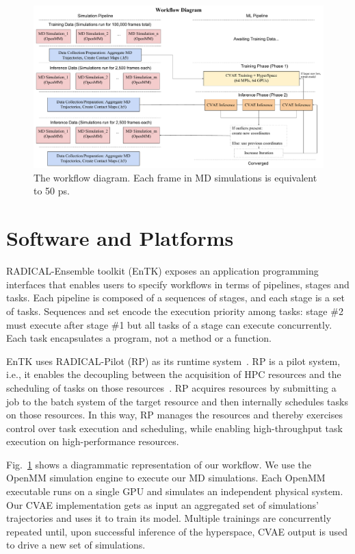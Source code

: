 \documentclass[conference,final]{IEEEtran}
\begin{document}
\begin{figure}
	\centering
	\includegraphics[width=.8\textwidth]{MicroScope_Workflow_Diagram}
	\caption{The workflow diagram. Each frame in MD simulations is equivalent to 50 ps. }
	\label{fig:microscopeworkflowdiagram}
\end{figure}

\section{Software and Platforms}

RADICAL-Ensemble toolkit (EnTK) exposes an application programming interfaces
that enables users to specify workflows in terms of pipelines, stages and
tasks. Each pipeline is composed of a sequences of stages, and each stage is
a set of tasks. Sequences and set encode the execution priority among tasks:
stage \#2 must execute after stage \#1 but all tasks of a stage can execute
concurrently. Each task encapsulates a program, not a method or a function.

EnTK uses RADICAL-Pilot (RP) as its runtime system~\cite{merzky2018using}. RP
is a pilot system, i.e., it enables the decoupling between the acquisition of
HPC resources and the scheduling of tasks on those
resources~\cite{turilli2018comprehensive}. RP acquires resources by
submitting a job to the batch system of the target resource and then
internally schedules tasks on those resources. In this way, RP manages the
resources and thereby exercises control over task execution and scheduling,
while enabling high-throughput task execution on high-performance resources.

Fig.~\ref{fig:microscopeworkflowdiagram} shows a diagrammatic representation
of our workflow. We use the OpenMM simulation engine to execute our MD
simulations. Each OpenMM executable runs on a single GPU and simulates an
independent physical system. Our CVAE implementation gets as input an
aggregated set of simulations' trajectories and uses it to train its model.
Multiple trainings are concurrently repeated until, upon successful inference
of the hyperspace, CVAE output is used to drive a new set of simulations.
\end{document}
